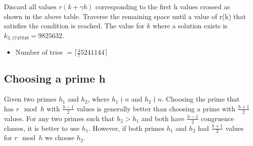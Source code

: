 \documentclass{article}
\begin{document}
{\begin{table}[H]
\begin{tabular}{|c|c|c|c|}
\end{tabular}
\end{table}
Discard all values $r(k+\gamma h)$ corresponding to the first h values crossed as shown in the above table. Traverse the remaining space until a value of r(k) that satisfies the condition is reached. The value for $k$ where a solution exists is $k_{3,1747048} = 9825632$.
\begin{itemize}\setlength\itemsep{1em}
\item Number of tries $= \lceil \frac{4}{7} 5241144 \rceil$
\end{itemize}
\subsection{Choosing a prime h}\label{ssec:choose_prime}
Given two primes $h_1$ and $h_2$, where $h_1 \nmid n$ and $h_2 \nmid n$. Choosing the prime that has $r \mod h$ with $\frac{h-1}{2}$ values is generally better than choosing a prime with $\frac{h+1}{2}$ values. For any two primes such that $h_2 > h_1$ and both have $\frac{h-1}{2}$ congruence classes, it is better to use $h_1$. However, if both primes $h_1$ and $h_2$ had $\frac{h+1}{2}$ values for $r \mod h$ we choose $h_2$.
}
\end{document}
